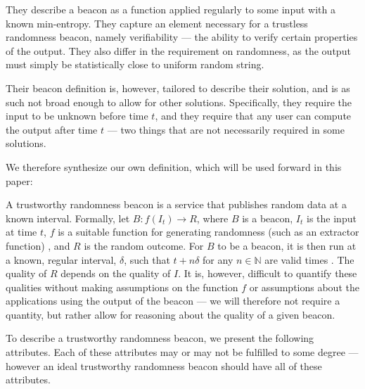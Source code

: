 They describe a beacon as a function applied regularly to some input with a known min-entropy.
They capture an element necessary for a trustless randomness beacon, namely verifiability --- the ability to verify certain properties of the output.
They also differ in the requirement on randomness, as the output must simply be statistically close to uniform random string.

Their beacon definition is, however, tailored to describe their solution, and is as such not broad enough to allow for other solutions.
Specifically, they require the input to be unknown before time $t$, and they require that any user can compute the output after time $t$ --- two things that are not necessarily required in some solutions.


We therefore synthesize our own definition, which will be used forward in this paper:

A trustworthy  randomness beacon is a service that publishes random data at a known interval.
Formally, let $B: f(I_t) \rightarrow R$, where $B$ is a beacon, $I_t$ is the input at time $t$, $f$ is a suitable function for generating randomness (such as an extractor function) , and $R$ is the random outcome.
For $B$ to be a beacon, it is then run at a known, regular interval, $\delta$, such that $t+n\delta$ for any $n \in \mathbb{N}$ are valid times .
The quality of $R$ depends on the quality of $I$.
It is, however, difficult to quantify these qualities without making assumptions on the function $f$ or assumptions about the applications using the output of the beacon --- we will therefore not require a quantity, but rather allow for reasoning about the quality of a given beacon.


To describe a trustworthy randomness beacon, we present the following attributes.
Each of these attributes may or may not be fulfilled to some degree --- however an ideal trustworthy randomness beacon should have all of these attributes.


